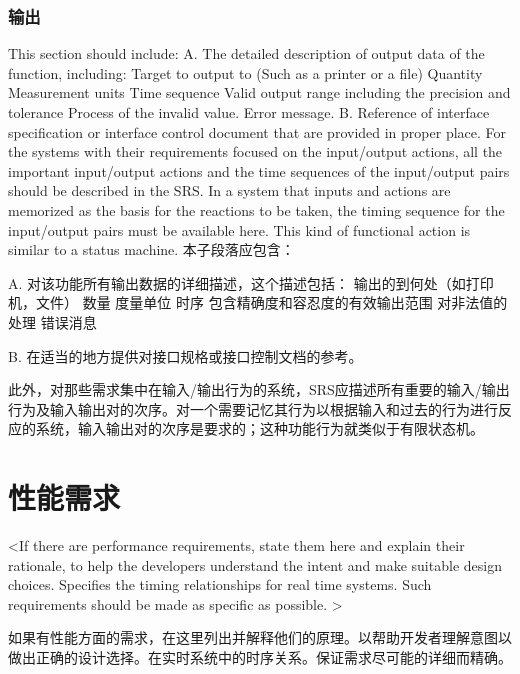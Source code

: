 \subsubsection{输出}
This section should include:
A. The detailed description of output data of the function, including:
		Target to output to (Such as a printer or a file)
		Quantity
		Measurement units
		Time sequence
		Valid output range including the precision and tolerance
		Process of the invalid value.
		Error message.
B. Reference of interface specification or interface control document that are provided in proper place.
For the systems with their requirements focused on the input/output actions, all the important input/output actions and the time sequences of the input/output pairs should be described in the SRS. In a system that inputs and actions are memorized as the basis for the reactions to be taken, the timing sequence for the input/output pairs must be available here. This kind of functional action is similar to a status machine.  
本子段落应包含：

A. 对该功能所有输出数据的详细描述，这个描述包括：
		输出的到何处（如打印机，文件）
		数量
		度量单位
		时序
		包含精确度和容忍度的有效输出范围
		对非法值的处理
		错误消息
		
B. 在适当的地方提供对接口规格或接口控制文档的参考。

此外，对那些需求集中在输入/输出行为的系统，SRS应描述所有重要的输入/输出行为及输入输出对的次序。对一个需要记忆其行为以根据输入和过去的行为进行反应的系统，输入输出对的次序是要求的；这种功能行为就类似于有限状态机。
\section{性能需求}
<If there are performance requirements, state them here and explain their rationale, to help the developers understand the intent and make suitable design choices. Specifies the timing relationships for real time systems. Such requirements should be made as specific as possible. >

如果有性能方面的需求，在这里列出并解释他们的原理。以帮助开发者理解意图以做出正确的设计选择。在实时系统中的时序关系。保证需求尽可能的详细而精确。
